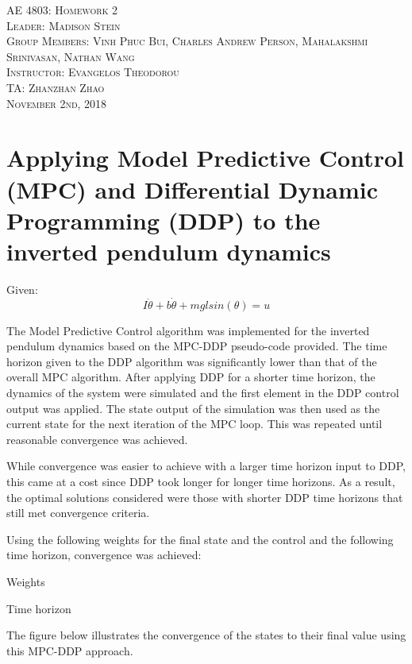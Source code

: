 \documentclass{article}
\begin{document}
\begin{titlepage}
    \center
    \textsc{\LARGE AE 4803: Homework 2}\\[1.5cm]
    \textsc{\Large Leader: Madison Stein}\\[0.5cm]
    \textsc{\Large Group Members: Vinh Phuc Bui, Charles Andrew Person, Mahalakshmi Srinivasan, Nathan Wang}\\[2cm]
    \textsc{\large Instructor: Evangelos Theodorou}\\[0.5cm]
    \textsc{\large TA: Zhanzhan Zhao}\\[1cm]
    \textsc{\large November 2nd, 2018}
\end{titlepage}

\section{Applying Model Predictive Control (MPC) and Differential Dynamic Programming (DDP) to the inverted pendulum dynamics}

Given:
\begin{equation}
I\ddot{\theta} +b\dot{\theta} + mglsin(\theta) = u
\end{equation}

The Model Predictive Control algorithm was implemented for the inverted pendulum dynamics based on the MPC-DDP pseudo-code provided. The time horizon given to the DDP algorithm was significantly lower than that of the overall MPC algorithm. After applying DDP for a shorter time horizon, the dynamics of the system were simulated and the first element in the DDP control output was applied. The state output of the simulation was then used as the current state for the next iteration of the MPC loop. This was repeated until reasonable convergence was achieved.


While convergence was easier to achieve with a larger time horizon input to DDP, this came at a cost since DDP took longer for longer time horizons. As a result, the optimal solutions considered were those with shorter DDP time horizons that still met convergence criteria.


Using the following weights for the final state and the control and the following time horizon, convergence was achieved:


Weights

Time horizon


The figure below illustrates the convergence of the states to their final value using this MPC-DDP approach.
\end{document}
